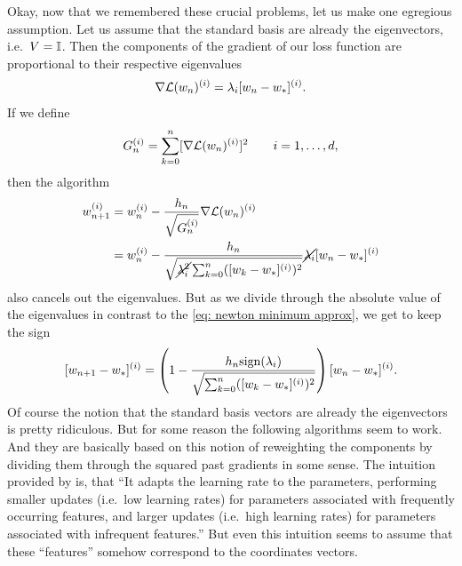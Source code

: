 Okay, now that we remembered these crucial problems, let us make one egregious
assumption. Let us assume that the standard basis are already the eigenvectors,
i.e.\ \(V=\mathbb{I}\). Then the components of the gradient of our loss function
are proportional to their respective eigenvalues
\begin{align*}
	\nabla\mathcal{L}(w_n)^{(i)}
	= \lambda_i [w_n - w_*]^{(i)}.
\end{align*}
If we define
\begin{align*}
	G_n^{(i)} = \sum_{k=0}^n [\nabla\mathcal{L}(w_n)^{(i)}]^2 \qquad i=1,\dots,d,
\end{align*}
then the algorithm
\begin{align}
	\label{eq: almost adagrad}
	w_{n+1}^{(i)}
	&= w_n^{(i)} - \frac{h_n}{\sqrt{G_n^{(i)}}}\nabla\mathcal{L}(w_n)^{(i)}\\
	\nonumber
	&= w_n^{(i)} - \frac{h_n}{
		\sqrt{\cancel{\lambda_i^2}\sum_{k=0}^n([w_k - w_*]^{(i)})^2}
	}
	\cancel{\lambda_i}[w_n - w_*]^{(i)}
\end{align}
also cancels out the eigenvalues. But as we divide through the absolute value of
the eigenvalues in contrast to the \ref{eq: newton minimum approx}, we get to
keep the sign
\begin{align}\label{eq: adagrad motivation contraction}
	[w_{n+1}-w_*]^{(i)} = \left(1-\frac{h_n\text{sign}(\lambda_i)}{
			\sqrt{\sum_{k=0}^n([w_k - w_*]^{(i)})^2}
		}\right)[w_n - w_*]^{(i)}.
\end{align}
Of course the notion that the standard basis vectors are already the eigenvectors
is pretty ridiculous. But for some reason the following algorithms seem to
work. And they are basically based on this notion of reweighting the components
by dividing them through the squared past gradients in some sense. The intuition
provided by \textcite{ruderOverviewGradientDescent2017} is, that
``It adapts the learning rate to the parameters, performing smaller updates
(i.e.\ low learning rates) for parameters associated with frequently occurring
features, and larger updates (i.e.\ high learning rates) for parameters
associated with infrequent features.'' But even this intuition seems to assume
that these ``features'' somehow correspond to the coordinates vectors.

